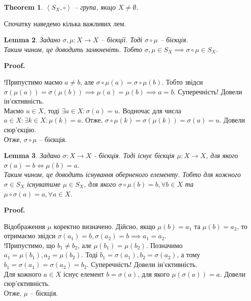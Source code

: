 \documentclass[a4paper, 10pt]{article}
\makeatletter
\theoremstyle{theoremdd}
\newtheorem{theorem}{Theorem}[subsection]
\theoremstyle{theoremdd}
\theoremstyle{theoremdd}
\theoremstyle{theoremdd}
\theoremstyle{theoremdd}
\theoremstyle{theoremdd}
\theoremstyle{theoremdd}
\theoremstyle{theoremdd}
\theoremstyle{theoremdd}
\theoremstyle{theoremdd}
\theoremstyle{theoremdd}
\theoremstyle{theoremdd}
\theoremstyle{theoremdd}
\newtheorem{lemma}[theorem]{Lemma}
\theoremstyle{theoremdd}
\theoremstyle{theoremdd}
\renewenvironment{proof}[1][Proof.\\]{\par
\pushQED{\hfill \qed}%
\normalfont \topsep6\p@\@plus6\p@\relax
\trivlist
\item\relax
{\bfseries
#1\@addpunct{.}}\hspace\labelsep\ignorespaces
}{%
\popQED\endtrivlist\@endpefalse
}
\makeatother
\begin{document}
\begin{theorem}
$\left< S_X, \circ \right>$ -- група, якщо $X \neq \emptyset$.
\end{theorem}

Спочатку наведемо кілька важливих лем.

\begin{lemma}
Задано $\sigma, \mu: X \to X$ -- бієкції. Тоді $\sigma \circ \mu$ -- бієкція.\\
Таким чином, це доводить замкненіть. Тобто $\sigma,\mu \in S_X \implies \sigma \circ \mu \in S_X$.
\end{lemma}

\begin{proof}
!Припустимо маємо $a \neq b$, але $\sigma \circ \mu (a) = \sigma \circ \mu (b)$. Тобто звідси $\sigma (\mu(a)) = \sigma (\mu(b)) \implies \mu(a) = \mu(b) \implies a = b$. Суперечність! Довели ін'єктивність.\\
Маємо $u\in X$, тоді $\exists a \in X: \sigma(a) = u$. Водночас для числа $a \in X: \exists k \in X: \mu(k) = a$. Отже, $\sigma \circ \mu (k) = \sigma(\mu(k)) = \sigma(a) = u$. Довели сюр'єкцію.\\
Отже, $\sigma \circ \mu$ -- бієкція.
\end{proof}

\begin{lemma}
Задано $\sigma \colon X \to X$ - бієкція. Тоді існує бієкція $\mu \colon X \to X$, для якого $\sigma(a) = b \iff \mu(b) = a$.\\
Таким чином, це доводить існування оберненого елементу. Тобто для кожного $\sigma \in S_X$ існуватиме $\mu \in S_X$, для якого $\sigma \circ \mu (b) = b, \forall b \in X$ та $\mu \circ \sigma (a) = a, \forall a \in X$.
\end{lemma}

\begin{proof}
Відображення $\mu$ коректно визначено. Дійсно, якщо $\mu(b) = a_1$ та $\mu(b) = a_2$, то отримаємо звідси $\sigma(a_1) = b, \sigma(a_2) = b \implies a_1 = a_2$.\\
!Припустимо, що $b_1 \neq b_2$, але $\mu(b_1) = \mu(b_2)$. Позначимо $a_1 = \mu(b_1), a_2 = \mu(b_2)$. Тоді $b_1 = \sigma(a_1), b_2 = \sigma(a_2)$, а тому $b_1 = \sigma(a_1) = \sigma(a_2) = b_2$. Суперечність! Довели ін'єктивність.\\
Для кожного $a \in X$ існує елемент $b = \sigma(a)$, для якого $\mu(\sigma(a)) = a$. Довели сюр'єктивність.\\
Отже, $\mu$ -- бієкція.
\end{proof}
\end{document}
